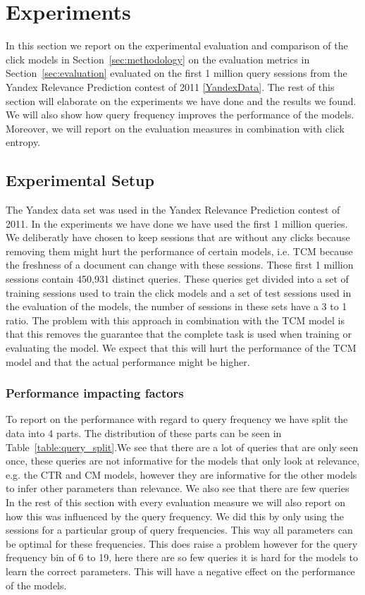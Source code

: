 \section{Experiments}
In this section we report on the experimental evaluation and comparison of the click models in Section~\ref{sec:methodology} on the evaluation metrics in Section~\ref{sec:evaluation} evaluated on the first 1 million query sessions from the Yandex Relevance Prediction contest of 2011 \ref{YandexData}. The rest of this section will elaborate on the experiments we have done and the results we found. We will also show how query frequency improves the performance of the models. Moreover, we will report on the evaluation measures in combination with click entropy.

\subsection{Experimental Setup}
The Yandex data set was used in the Yandex Relevance Prediction contest of 2011. In the experiments we have done we have used the first 1 million queries. We deliberatly have chosen to keep sessions that are without any clicks because removing them might hurt the performance of certain models, i.e. TCM because the freshness of a document can change with these sessions. These first 1 million sessions contain 450,931 distinct queries. These queries get divided into a set of training sessions used to train the click models and a set of test sessions used in the evaluation of the models, the number of sessions in these sets have a 3 to 1 ratio. The problem with this approach in combination with the TCM model is that this removes the guarantee that the complete task is used when training or evaluating the model. We expect that this will hurt the performance of the TCM model and that the actual performance might be higher. 

\subsubsection{Performance impacting factors}
To report on the performance with regard to query frequency we have split the data into 4 parts. The distribution of these parts can be seen in Table~\ref{table:query_split}.We see that there are a lot of queries that are only seen once, these queries are not informative for the models that only look at relevance, e.g. the CTR and CM models, however they are informative for the other models to infer other parameters than relevance. We also see that there are few queries In the rest of this section with every evaluation measure we will also report on how this was influenced by the query frequency. We did this by only using the sessions for a particular group of query frequencies. This way all parameters can be optimal for these frequencies. This does raise a problem however for the query frequency bin of 6 to 19, here there are so few queries it is hard for the models to learn the correct parameters. This will have a negative effect on the performance of the models. 

